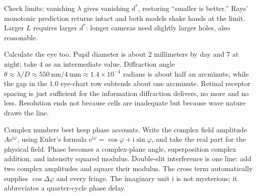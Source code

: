 \begin{center}
\end{center}

Check limits: vanishing \(\lambda\) gives vanishing \(d^{*}\), restoring ``smaller is better.'' Rays' monotonic prediction returns intact and both models shake hands at the limit. Larger \(L\) requires larger \(d^{*}\): longer cameras need slightly larger holes, also reasonable.

Calculate the eye too. Pupil diameter is about \(2\) millimeters by day and \(7\) at night; take \(4\) as an intermediate value. Diffraction angle \(\theta\approx\lambda/D\approx 550\ \mathrm{nm}/4\ \mathrm{mm}\approx1.4\times10^{-4}\) radians is about half an arcminute, while the gap in the \(1.0\) eye-chart row subtends about one arcminute. Retinal receptor spacing is just sufficient for the information diffraction delivers, no more and no less. Resolution ends not because cells are inadequate but because wave nature draws the line.

\begin{mathbridge}
Complex numbers best keep phase accounts. Write the complex field amplitude \(A\mathrm e^{\mathrm i\varphi}\), using Euler's formula \(\mathrm e^{\mathrm i\varphi}=\cos\varphi+\mathrm i\sin\varphi\), and take the real part for the physical field. Phase becomes a complex-plane angle, superposition complex addition, and intensity squared modulus. Double-slit interference is one line: add two complex amplitudes and square their modulus. The cross term automatically supplies \(\cos\Delta\varphi\) and every fringe. The imaginary unit \(\mathrm i\) is not mysterious; it abbreviates a quarter-cycle phase delay.
\end{mathbridge}

